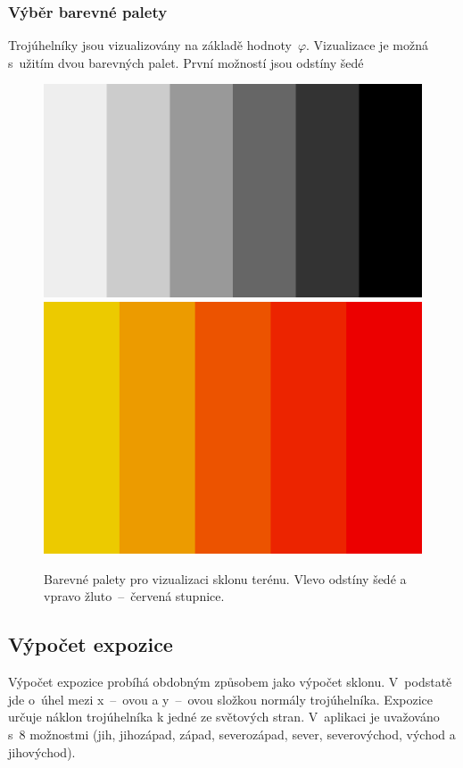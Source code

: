 \documentclass[a4paper, 12pt, oneside, titlepage]{article} %
\begin{document}
\subsubsection{Výběr barevné palety}
Trojúhelníky jsou vizualizovány na základě hodnoty~$\varphi$. Vizualizace je možná s~užitím dvou barevných palet. První možností jsou odstíny šedé

 \begin{figure}[!htb]
	\centering
	\includegraphics[scale=0.11]{obrazky/gs.png} 
	\includegraphics[scale=0.2]{obrazky/yr.png}
	\caption{Barevné palety pro vizualizaci sklonu terénu. Vlevo odstíny šedé a vpravo žluto~--~červená stupnice.
	}
	\label{fig:th_pol}
\end{figure} 
\FloatBarrier
\subsection{Výpočet expozice}\label{vyp_exp}
Výpočet expozice probíhá obdobným způsobem jako výpočet sklonu. V~podstatě jde o~úhel mezi x~--~ovou a y~--~ovou složkou normály trojúhelníka. Expozice určuje náklon trojúhelníka k jedné ze světových stran. V~aplikaci je uvažováno s~8 možnostmi (jih, jihozápad, západ, severozápad, sever, severovýchod, východ a  jihovýchod).
\end{document}
